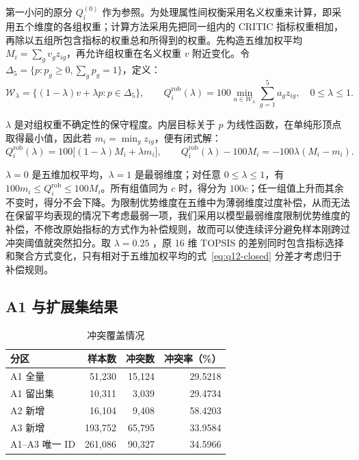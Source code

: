 第一小问的原分 $Q_i^{(0)}$ 作为参照。为处理属性间权衡采用名义权重来计算，即采用五个维度的各组权重；计算方法采用先把同一组内的 CRITIC 指标权重相加，再除以五组所包含指标的权重总和所得到的权重。先构造五维加权平均 $M_i=\sum_gv_gz_{ig}$，再允许组权重在名义权重 $v$ 附近变化。令 $\Delta_5=\{p:p_g\geq0,\sum_gp_g=1\}$，定义：
\begin{equation}
\mathcal W_{\lambda}=\{(1-\lambda)v+\lambda p:p\in\Delta_5\},\qquad
Q_i^{\mathrm{rob}}(\lambda)=100\min_{a\in\mathcal W_{\lambda}}\sum_{g=1}^{5}a_gz_{ig},
\quad 0\leq\lambda\leq1.
\label{eq:q12-robust}
\end{equation}

$\lambda$ 是对组权重不确定性的保守程度。内层目标关于 $p$ 为线性函数，在单纯形顶点取得最小值，因此若 $m_i=\min_g z_{ig}$，便有闭式解：
\begin{equation}
Q_i^{\mathrm{rob}}(\lambda)=100\big[(1-\lambda)M_i+\lambda m_i\big],\qquad
Q_i^{\mathrm{rob}}(\lambda)-100M_i=-100\lambda(M_i-m_i).
\label{eq:q12-closed}
\end{equation}

$\lambda=0$ 是五维加权平均，$\lambda=1$ 是最弱维度；对任意 $0\leq\lambda\leq1$，有 $100m_i\leq Q_i^{\mathrm{rob}}\leq100M_i$。所有组值同为 $c$ 时，得分为 $100c$；任一组值上升而其余不变时，得分不会下降。为限制优势维度在五维中为薄弱维度过度补偿，从而无法在保留平均表现的情况下考虑最弱一项，我们采用以模型最弱维度限制优势维度的补偿，不修改原始指标的方式作为补偿规则，故而可以使连续评分避免样本刚跨过冲突阈值就突然扣分。取 $\lambda=0.25$ ，原 16 维 TOPSIS 的差别同时包含指标选择和聚合方式变化，只有相对于五维加权平均的式~\eqref{eq:q12-closed} 分差才考虑归于补偿规则。

\subsection{A1 与扩展集结果}

\begin{table}[htbp]
\centering
\caption{冲突覆盖情况}
\label{tab:q12-coverage}
\begin{tabular}{lrrr}
\toprule
分区 & 样本数 & 冲突数 & 冲突率（\%） \\
\midrule
A1 全量         & 51,230  & 15,124 & 29.5218 \\
A1 留出集       & 10,311  & 3,039  & 29.4734 \\
A2 新增         & 16,104  & 9,408  & 58.4203 \\
A3 新增         & 193,752 & 65,795 & 33.9584 \\
A1--A3 唯一 ID & 261,086 & 90,327 & 34.5966 \\
\bottomrule
\end{tabular}
\end{table}

